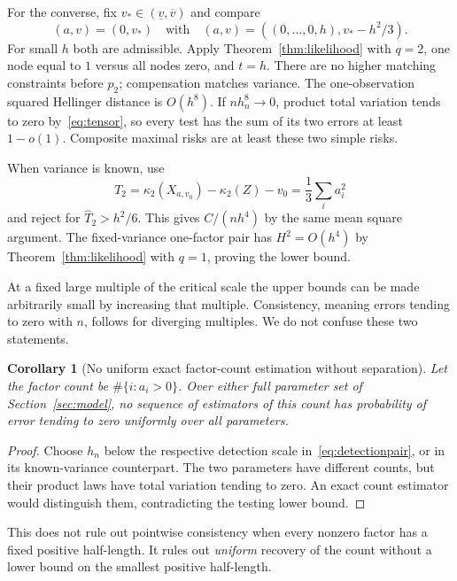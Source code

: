 \documentclass[11pt,a4paper]{article}
\numberwithin{equation}{section}
\newtheorem{corollary}[theorem]{Corollary}
\theoremstyle{definition}
\theoremstyle{remark}
\newcommand{\kap}{\kappa}
\begin{document}
For the converse, fix $v_*\in(\underline v,\overline v)$ and compare
\begin{equation}
 (a,v)=(0,v_*)\quad\text{with}\quad
 (a,v)=((0,\ldots,0,h),v_*-h^2/3).
 \label{eq:detectionpair}
\end{equation}
For small $h$ both are admissible. Apply Theorem~\ref{thm:likelihood} with
$q=2$, one node equal to $1$ versus all nodes zero, and $t=h$. There are no
higher matching constraints before $p_2$; compensation matches variance.
The one-observation squared Hellinger distance is $O(h^8)$. If $nh_n^8\to0$,
product total variation tends to zero by~\eqref{eq:tensor}, so every test
has the sum of its two errors at least $1-o(1)$. Composite maximal risks
are at least these two simple risks.

When variance is known, use
\begin{equation}
 T_2=\kap_2(X_{a,v_0})-\kap_2(Z)-v_0
     =\frac13\sum_i a_i^2
\end{equation}
and reject for $\widehat T_2>h^2/6$. This gives $C/(nh^4)$ by the same mean
square argument. The fixed-variance one-factor pair has $H^2=O(h^4)$ by
Theorem~\ref{thm:likelihood} with $q=1$, proving the lower bound.

At a fixed large multiple of the critical scale the upper bounds can be
made arbitrarily small by increasing that multiple. Consistency, meaning
errors tending to zero with $n$, follows for diverging multiples. We do not
confuse these two statements.

\begin{corollary}[No uniform exact factor-count estimation without separation]
\label{cor:rank}
Let the factor count be $\#\{i:a_i>0\}$. Over either full parameter set of
Section~\ref{sec:model}, no sequence of estimators of this count has
probability of error tending to zero uniformly over all parameters.
\end{corollary}
\begin{proof}
Choose $h_n$ below the respective detection scale in~\eqref{eq:detectionpair},
or in its known-variance counterpart. The two parameters have different
counts, but their product laws have total variation tending to zero. An
exact count estimator would distinguish them, contradicting the testing
lower bound.
\end{proof}

This does not rule out pointwise consistency when every nonzero factor has
a fixed positive half-length. It rules out \emph{uniform} recovery of the
count without a lower bound on the smallest positive half-length.
\end{document}
